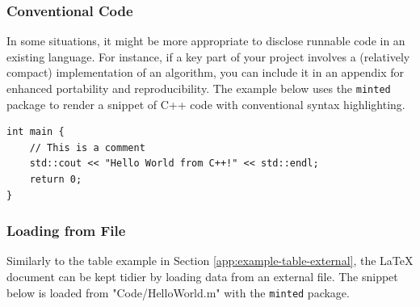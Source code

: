 \subsubsection{Conventional Code}

In some situations, it might be more appropriate to disclose runnable code in an existing language. 
For instance, if a key part of your project involves a (relatively compact) implementation of an algorithm, you can include it in an appendix for enhanced portability and reproducibility.
The example below uses the \verb|minted| package to render a snippet of C++ code with conventional syntax highlighting. 


\begin{verbatim}
int main {
    // This is a comment
    std::cout << "Hello World from C++!" << std::endl;
    return 0;
}
\end{verbatim}

\subsubsection{Loading from File}

Similarly to the table example in Section \ref{app:example-table-external}, the LaTeX document can be kept tidier by loading data from an external file.
The snippet below is loaded from "Code/HelloWorld.m" with the \verb|minted| package.

\inputminted[breaklines]{Matlab}{./Code/HelloWorld.m}

